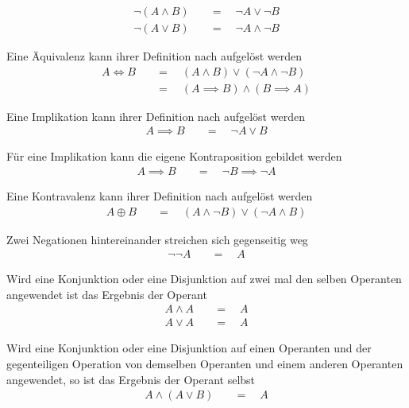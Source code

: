 \documentclass{article}
\newcommand{\feq}{\quad &= \quad}
\begin{document}
\begin{description}
\begin{align*}
 \neg (A \land B) \feq \neg A \lor \neg B \\
 \neg (A \lor B) \feq \neg A \land \neg B
\end{align*}
 \item[Äquivalenzauflösung] Eine Äquivalenz kann ihrer Definition nach aufgelöst werden
\begin{align*}
 A \iff B \feq (A \land B) \lor (\neg A \land \neg B) \\
 \feq (A \implies B) \land (B \implies A) 
\end{align*}
 \item[Implikationsauflösung] Eine Implikation kann ihrer Definition nach aufgelöst werden
\begin{align*}
 A \implies B \feq \neg A \lor B
\end{align*}
 \item[Kontraposition] Für eine Implikation kann die eigene Kontraposition gebildet werden
\begin{align*}
 A \implies B \feq \neg B \implies \neg A
\end{align*}
 \item[Kontravalenzauflösung] Eine Kontravalenz kann ihrer Definition nach aufgelöst werden
\begin{align*}
 A \oplus B \feq (A \land \neg B) \lor (\neg A \land B)
\end{align*}
 \item[Doppelnegation] Zwei Negationen hintereinander streichen sich gegenseitig weg
\begin{align*}
 \neg \neg A \feq A
\end{align*}
 \item[Idempotenz] Wird eine Konjunktion oder eine Disjunktion auf zwei mal den selben Operanten angewendet ist das Ergebnis der Operant 
\begin{align*}
 A \land A \feq A \\
 A \lor A \feq A
\end{align*}
 \item[Absorption] Wird eine Konjunktion oder eine Disjunktion auf einen Operanten und der gegenteiligen Operation von demselben Operanten und einem anderen Operanten angewendet, so ist das Ergebnis der Operant selbst
\begin{align*}
 A \land (A \lor B) \feq A \\

\end{align*}
\end{description}
\end{document}
